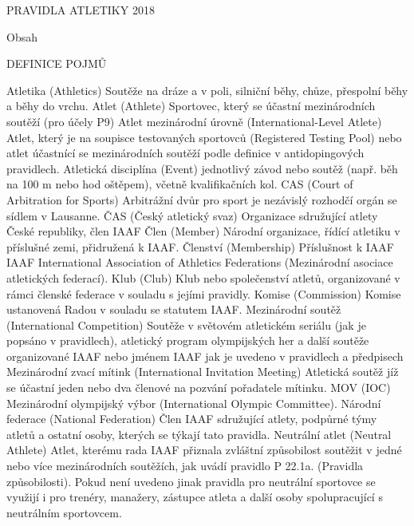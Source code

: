 

\tit PRAVIDLA ATLETIKY 2018

\vfill
\break

\nonum\notoc\chap Obsah

\maketoc

\vfill
\break

\nonum\chap DEFINICE POJMŮ

\dt Atletika (Athletics)
\dd Soutěže na dráze a v poli, silniční běhy, chůze, přespolní běhy a běhy do vrchu.
\dend
\dt Atlet (Athlete)
\dd Sportovec, který se účastní mezinárodních soutěží (pro účely P9)
\dend
\dt Atlet mezinárodní úrovně (International-Level Atlete)
\dd Atlet, který je na soupisce testovaných sportovců (Registered Testing Pool) nebo atlet účastnící se mezinárodních soutěží podle definice v antidopingových pravidlech.
\dend
\dt Atletická disciplína (Event)
\dd jednotlivý závod nebo soutěž (např. běh na 100 m nebo hod oštěpem), včetně kvalifikačních kol.
\dend
\dt CAS (Court of Arbitration for Sports)
\dd Arbitrážní dvůr pro sport je nezávislý rozhodčí orgán se sídlem v Lausanne.
\dend
\dt ČAS (Český atletický svaz)
\dd Organizace sdružující atlety České republiky, člen IAAF
\dend
\dt Člen (Member)
\dd Národní organizace, řídící atletiku v příslušné zemi, přidružená k IAAF.
\dend
\dt Členství (Membership)
\dd Příslušnost k IAAF
\dend
\dt IAAF
\dd International Association of Athletics Federations (Mezinárodní asociace atletických federací).
\dend
\dt Klub (Club)
\dd Klub nebo společenství atletů, organizované v rámci členské federace v souladu s jejími pravidly.
\dend
\dt Komise (Commission)
\dd Komise ustanovená Radou v souladu se statutem IAAF.
\dend
\dt Mezinárodní soutěž (International Competition)
\dd Soutěže v světovém atletickém seriálu (jak je popsáno v pravidlech), atletický program olympijských her a další soutěže organizované IAAF nebo jménem IAAF jak je uvedeno v pravidlech a předpisech
\dend
\dt Mezinárodní zvací mítink (International Invitation Meeting)
\dd Atletická soutěž jíž se účastní jeden nebo dva členové na pozvání pořadatele mítinku.
\dend
\dt MOV (IOC)
\dd Mezinárodní olympijský výbor (International Olympic Committee).
\dend
\dt Národní federace (National Federation)
\dd Člen IAAF sdružující atlety, podpůrné týmy atletů a ostatní osoby, kterých se týkají tato pravidla.
\dend
\dt Neutrální atlet (Neutral Athlete)
\dd Atlet, kterému rada IAAF přiznala zvláštní způsobilost soutěžit v jedné nebo více mezinárodních soutěžích, jak uvádí pravidlo P 22.1a. (Pravidla způsobilosti). Pokud není uvedeno jinak pravidla pro neutrální sportovce se využijí i pro trenéry, manažery, zástupce atleta a další osoby spolupracující s neutrálním sportovcem.
